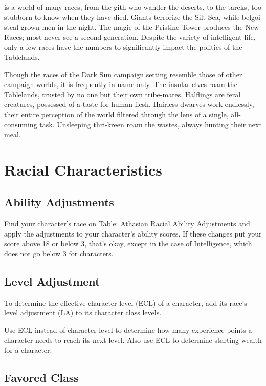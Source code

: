  is a world of many races, from the gith who wander the deserts, to the tareks, too stubborn to know when they have died. Giants terrorize the Silt Sea, while belgoi steal grown men in the night. The magic of the Pristine Tower produces the New Races; most never see a second generation. Despite the variety of intelligent life, only a few races have the numbers to significantly impact the politics of the Tablelands.

Though the races of the Dark Sun campaign setting resemble those of other campaign worlds, it is frequently in name only. The insular elves roam the Tablelands, trusted by no one but their own tribe-mates. Halflings are feral creatures, possessed of a taste for human flesh. Hairless dwarves work endlessly, their entire perception of the world filtered through the lens of a single, all-consuming task. Unsleeping thri-kreen roam the wastes, always hunting their next meal.

\section{Racial Characteristics}

\subsection{Ability Adjustments}

Find your character's race on \hyperref[tab:Athasian Racial Ability Adjustments]{Table: Athasian Racial Ability Adjustments} and apply the adjustments to your character's ability scores. If these changes put your score above 18 or below 3, that's okay, except in the case of Intelligence, which does not go below 3 for characters.

\subsection{Level Adjustment}

To determine the effective character level (ECL) of a character, add its race's level adjustment (LA) to its character class levels.

Use ECL instead of character level to determine how many experience points a character needs to reach its next level. Also use ECL to determine starting wealth for a character.

\subsection{Favored Class}

